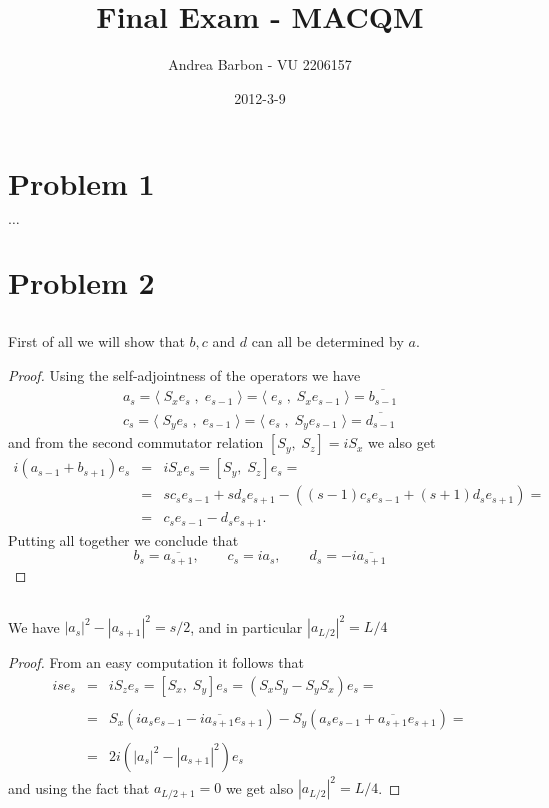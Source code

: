 \documentclass[]{article}
\title{Final Exam - MACQM}
\author{ Andrea Barbon - VU 2206157 }
\date{2012-3-9}
\newcommand{\la}{\langle}
\newcommand{\ra}{\rangle}
\newcommand{\inn}[2]{\la\; #1 \; ,\; #2 \;\ra}
\newcommand{\sx}{S_x}
\newcommand{\sy}{S_y}
\newcommand{\sz}{S_z}
\begin{document}
\ifpdf
{}
\else
{}
\fi

\maketitle

\section{Problem 1}
$\dots$



\section{Problem 2}

\subsection{}\label{2.1}

First of all we will show that $b,c$ and $d$ can all be determined by $a$. 
\begin{proof}
	Using the self-adjointness of the operators we have 
	\begin{eqnarray*}
		a_s = \inn{\sx e_s}{e_{s-1}} = \inn{e_s}{\sx e_{s-1}} =  \overline{b_{s-1}} \\
		c_s = \inn{\sy e_s}{e_{s-1}} = \inn{e_s}{\sy e_{s-1}} =  \overline{d_{s-1}}
	\end{eqnarray*}
	and from the second commutator relation $[\sy,\;\sz]=i\sx$ we also get
	\begin{eqnarray*}
		i (a_{s-1} + b_{s+1}) e_s &=& i\sx e_s = [\sy,\;\sz]e_s = \\
		&=& sc_se_{s-1}+sd_se_{s+1}-((s-1)c_se_{s-1}+(s+1)d_se_{s+1}) = \\
		&=& c_se_{s-1}-d_se_{s+1}.
	\end{eqnarray*}
	Putting all together we conclude that
	$$ b_s = \overline{a_{s+1}}, \qquad c_s = ia_s, \qquad d_s = -i\overline{a_{s+1}} $$
\end{proof}

\subsection{}
We have $ |a_s|^2 - |a_{s+1}|^2 = s/2 $, and in particular $|a_{L/2}|^2=L/4$
\begin{proof}
	From an easy computation it follows that
	\begin{eqnarray*}
		i s e_s &=& i\sz e_s = [\sx,\;\sy]e_s = (\sx\sy-\sy\sx)e_s = \\\\
		&=& \sx(ia_se_{s-1} - i\overline{a_{s+1}}e_{s+1}) - \sy(a_se_{s-1} + \overline{a_{s+1}}e_{s+1}) = \\\\
		&=& 2i(|a_s|^2-|a_{s+1}|^2)e_s
	\end{eqnarray*}
	and using the fact that $a_{L/2+1}=0$ we get also $|a_{L/2}|^2=L/4$.
\end{proof}
\end{document}
